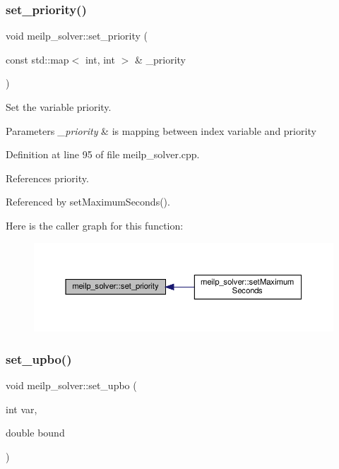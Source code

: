 \subsubsection{\texorpdfstring{set\+\_\+priority()}{set\_priority()}}
{\footnotesize\ttfamily void meilp\+\_\+solver\+::set\+\_\+priority (\begin{DoxyParamCaption}\item[{const std\+::map$<$ int, int $>$ \&}]{\+\_\+priority }\end{DoxyParamCaption})}



Set the variable priority. 


\begin{DoxyParams}{Parameters}
{\em \+\_\+priority} & is mapping between index variable and priority \\
\hline
\end{DoxyParams}


Definition at line 95 of file meilp\+\_\+solver.\+cpp.



References priority.



Referenced by set\+Maximum\+Seconds().

Here is the caller graph for this function\+:
\nopagebreak
\begin{figure}[H]
\begin{center}
\leavevmode
\includegraphics[width=350pt]{dc/d7f/classmeilp__solver_a40f8db00eeeeff115b97ffaf9511bab2_icgraph}
\end{center}
\end{figure}
\mbox{\label{classmeilp__solver_ab6329596a134f01a88802c37bf3aee0b}} 
\subsubsection{\texorpdfstring{set\+\_\+upbo()}{set\_upbo()}}
{\footnotesize\ttfamily void meilp\+\_\+solver\+::set\+\_\+upbo (\begin{DoxyParamCaption}\item[{int}]{var,  }\item[{double}]{bound }\end{DoxyParamCaption})\hspace{0.3cm}{\ttfamily [virtual]}}



